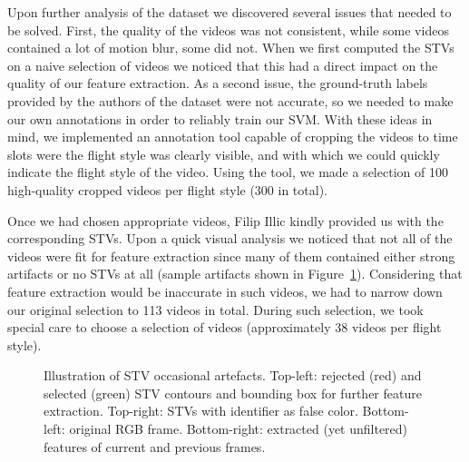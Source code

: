 \documentclass[a4paper, textwidth=18cm, textheight=24cm, top=1cm, bottom=1cm, left=1cm, right=1cm10pt]{article}
\begin{document}
Upon further analysis of the dataset we discovered several issues that needed to be solved. First, the quality of the videos was not consistent, while some videos contained a lot of motion blur, some did not. When we first computed the STVs on a naive selection of videos we noticed that this had a direct impact on the quality of our feature extraction. As a second issue, the ground-truth labels provided by the authors of the dataset were not accurate, so we needed to make our own annotations in order to reliably train our SVM. With these ideas in mind, we implemented an annotation tool capable of cropping the videos to time slots were the flight style was clearly visible, and with which we could quickly indicate the flight style of the video. Using the tool, we made a selection of 100 high-quality cropped videos per flight style (300 in total).

Once we had chosen appropriate videos, Filip Illic kindly provided us with the corresponding STVs. Upon a quick visual analysis we noticed that not all of the videos were fit for feature extraction since many of them contained either strong artifacts or no STVs at all (sample artifacts shown in Figure~\ref{fig:artefacts}). Considering that feature extraction would be inaccurate in such videos, we had to narrow down our original selection to 113 videos in total. During such selection, we took special care to choose a selection of videos (approximately 38 videos per flight style).

\begin{figure}[!htb]
\caption{\label{fig:artefacts} Illustration of STV occasional artefacts. Top-left: rejected (red) and selected (green) STV contours and bounding box for further feature extraction. Top-right: STVs with identifier as false color. Bottom-left: original RGB frame. Bottom-right: extracted (yet unfiltered) features of current and previous frames.}
\end{figure}
\end{document}
